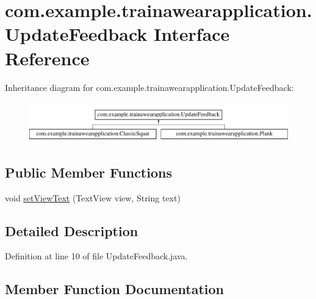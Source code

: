 \hypertarget{interfacecom_1_1example_1_1trainawearapplication_1_1_update_feedback}{}\section{com.\+example.\+trainawearapplication.\+Update\+Feedback Interface Reference}
\label{interfacecom_1_1example_1_1trainawearapplication_1_1_update_feedback}
Inheritance diagram for com.\+example.\+trainawearapplication.\+Update\+Feedback\+:\begin{figure}[H]
\begin{center}
\leavevmode
\includegraphics[height=1.766562cm]{interfacecom_1_1example_1_1trainawearapplication_1_1_update_feedback}
\end{center}
\end{figure}
\subsection*{Public Member Functions}
\begin{DoxyCompactItemize}
\item 
void \mbox{\hyperlink{interfacecom_1_1example_1_1trainawearapplication_1_1_update_feedback_a7a026880188b11aca6d8184d57e699e8}{set\+View\+Text}} (Text\+View view, String text)
\end{DoxyCompactItemize}


\subsection{Detailed Description}


Definition at line 10 of file Update\+Feedback.\+java.



\subsection{Member Function Documentation}
\mbox{\label{interfacecom_1_1example_1_1trainawearapplication_1_1_update_feedback_a7a026880188b11aca6d8184d57e699e8}} 
